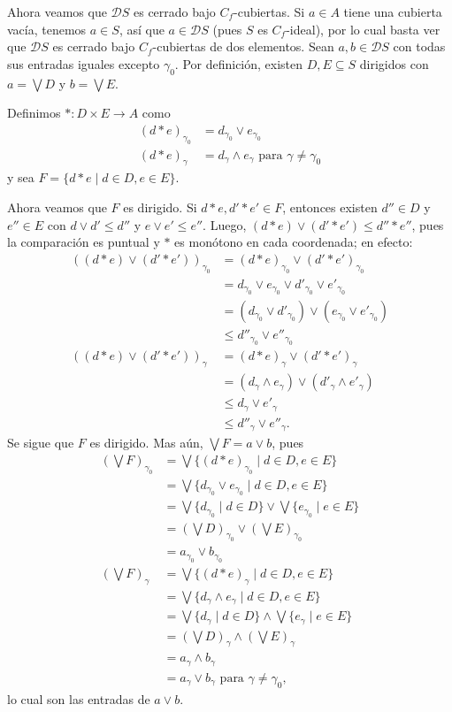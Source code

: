 \documentclass[12pt,letterpaper,titlepage]{article}
\theoremstyle{definition}
\renewcommand\sup{\vee}
\newcommand\Sup{\bigvee}
\renewcommand\inf{\wedge}
\newcommand\D{\mathcal D}
\newcommand\<{\langle}
\renewcommand\>{\rangle}
\begin{document}
Ahora veamos que $\D S$ es cerrado bajo $C_f$-cubiertas.
Si $a\in A$ tiene una cubierta vacía, tenemos $a\in S$, así que
$a\in\D S$ (pues $S$ es $C_f$-ideal),
por lo cual basta ver que $\D S$ es cerrado
bajo $C_f$-cubiertas de dos elementos.
Sean $a,b\in\D S$ con todas sus entradas iguales excepto
$\gamma_0$.
Por definición, existen $D,E\subseteq S$ dirigidos con
$a=\Sup D$ y $b=\Sup E$.

Definimos $*:D\times E\to A$ como
\begin{align*}
  (d*e)_{\gamma_0} &= d_{\gamma_0} \sup e_{\gamma_0} \\
  (d*e)_{\gamma} &= d_{\gamma} \inf e_{\gamma} \text{ para }
  \gamma\neq\gamma_0
\end{align*}
y sea $F=\{d*e \mid d\in D, e\in E\}$.

Ahora veamos que $F$ es dirigido.
Si $d*e,d'*e'\in F$, entonces existen $d''\in D$ y $e''\in E$ con
$d\sup d'\leq d''$ y $e\sup e'\leq e''$.
Luego, $(d*e)\sup(d'*e')\leq d''*e''$, pues la comparación es
puntual y $*$ es monótono en cada coordenada; en efecto:
\begin{align*}
  ((d*e)\sup(d'*e'))_{\gamma_0}
  &= (d*e)_{\gamma_0} \sup (d'*e')_{\gamma_0} \\
  &= d_{\gamma_0}\sup e_{\gamma_0}\sup d'_{\gamma_0}\sup
    e'_{\gamma_0} \\
  &= (d_{\gamma_0}\sup d'_{\gamma_0})
    \sup(e_{\gamma_0}\sup e'_{\gamma_0}) \\
  &\leq d''_{\gamma_0} \sup e''_{\gamma_0}
  \\
  ((d*e)\sup(d'*e'))_{\gamma}
  &= (d*e)_{\gamma} \sup (d'*e')_{\gamma} \\
  &= (d_\gamma\inf e_\gamma)\sup(d'_\gamma\inf e'_\gamma) \\
  &\leq d_\gamma \sup e'_\gamma \\
  &\leq d''_\gamma \sup e''_\gamma.
\end{align*}
Se sigue que $F$ es dirigido.
Mas aún, $\Sup F = a\sup b$, pues
\begin{align*}
  (\Sup F)_{\gamma_0}
  &= \Sup\{(d*e)_{\gamma_0} \mid d\in D,e\in E\} \\
  &= \Sup\{d_{\gamma_0}\sup e_{\gamma_0} \mid d\in D,e\in E\} \\
  &= \Sup\{d_{\gamma_0}\mid d\in D\}
    \sup \Sup\{e_{\gamma_0}\mid e\in E\} \\
  &= (\Sup D)_{\gamma_0} \sup (\Sup E)_{\gamma_0} \\
  &= a_{\gamma_0} \sup b_{\gamma_0}
  \\
  (\Sup F)_\gamma
  &= \Sup\{(d*e)_\gamma\mid d\in D,e\in E\} \\
  &= \Sup\{d_\gamma\inf e_\gamma\mid d\in D,e\in E\} \\
  &= \Sup\{d_\gamma\mid d\in D\}
    \inf \Sup\{e_\gamma\mid e\in E\} \\
  &= (\Sup D)_\gamma \inf (\Sup E)_\gamma \\
  &= a_\gamma \inf b_\gamma \\
  &= a_\gamma \sup b_\gamma \text{ para }\gamma\neq\gamma_0,
\end{align*}
lo cual son las entradas de $a\sup b$.
\end{document}
